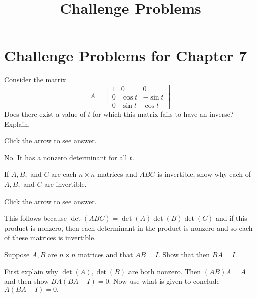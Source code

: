 \documentclass{ximera}
\title{Challenge Problems} \license{CC BY-NC-SA 4.0}
\begin{document}
\begin{abstract}
\end{abstract}
\maketitle

\section*{Challenge Problems for Chapter 7}

\begin{problem}\label{prb:7.32} Consider the matrix
\begin{equation*}
A =
\left[
\begin{array}{ccc}
1 & 0 & 0 \\
0 & \cos t & -\sin t \\
0 & \sin t & \cos t
\end{array}
\right]
\end{equation*}
Does there exist a value of $t$ for which this matrix fails to have an
inverse? Explain.

Click the arrow to see answer.
\begin{expandable}{}{}
 No. It has a nonzero determinant for all $t$.
\end{expandable}
\end{problem}

\begin{problem}\label{prb:7.41} If $A,B,$ and $C$ are each $n\times n$ matrices and $ABC$ is
invertible, show why each of $A,B,$ and $C$ are invertible.

Click the arrow to see answer.

\begin{expandable}{}{}
This follows
because $\det \left( ABC\right) =\det \left( A\right) \det \left( B\right)
\det \left( C\right) $ and if this product is nonzero, then each determinant
in the product is nonzero and so each of these matrices is invertible.
\end{expandable}
\end{problem}

\begin{problem}\label{prb:7.37} Suppose $A,B$ are $n\times n$ matrices and that $AB=I.$ Show that then
$BA=I.$ 
\begin{hint}
First explain why
$\det \left( A\right) ,\det \left( B\right) $ are both nonzero. Then $\left(
AB\right) A=A$ and then show $BA\left( BA-I\right) =0.$ Now use what
is given to conclude $A\left( BA-I\right) =0.$ 
\end{hint}
\end{problem}
\end{document}
